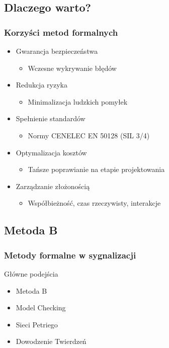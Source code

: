 \documentclass{beamer}
\begin{document}
\subsection{Dlaczego warto?}
\begin{frame}
\frametitle{Korzyści metod formalnych}
\begin{itemize}
\item Gwarancja bezpieczeństwa
\begin{itemize}
\item Wczesne wykrywanie błędów
\end{itemize}

\item Redukcja ryzyka
\begin{itemize}
\item Minimalizacja ludzkich pomyłek
\end{itemize}

\item Spełnienie standardów
\begin{itemize}
\item Normy CENELEC EN 50128 (SIL 3/4)
\end{itemize}

\item Optymalizacja kosztów
\begin{itemize}
\item Tańsze poprawianie na etapie projektowania
\end{itemize}

\item Zarządzanie złożonością
\begin{itemize}
\item Współbieżność, czas rzeczywisty, interakcje
\end{itemize}
\end{itemize}
\end{frame}

\subsection{Metoda B}
\begin{frame}
\frametitle{Metody formalne w sygnalizacji}
\begin{block}{Główne podejścia}
\begin{itemize}
\item Metoda B
\item Model Checking
\item Sieci Petriego
\item Dowodzenie Twierdzeń
\end{itemize}
\end{block}
\end{frame}
\end{document}
